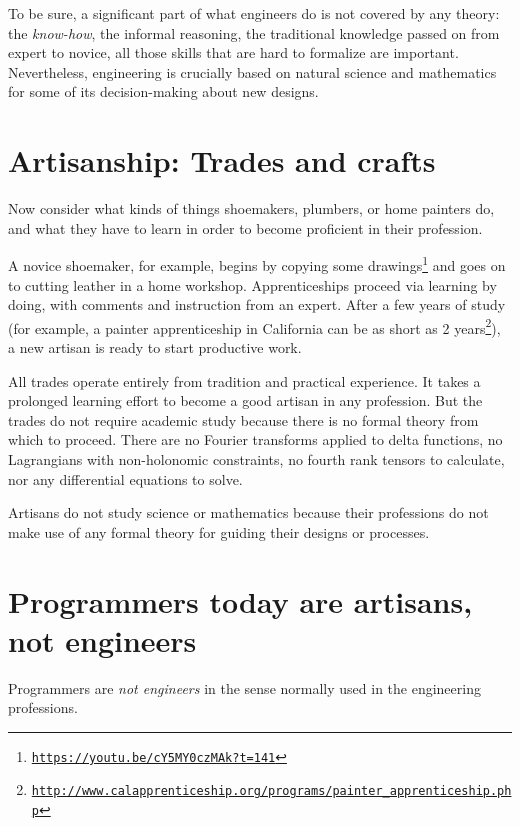 To be sure, a significant part of what engineers do is not covered
by any theory: the \emph{know-how}, the informal reasoning, the traditional
knowledge passed on from expert to novice,  \textemdash{} all those
skills that are hard to formalize are important. Nevertheless, engineering
is crucially based on natural science and mathematics for some of
its decision-making about new designs.

\section{Artisanship: Trades and crafts }

Now consider what kinds of things shoemakers, plumbers, or home painters
do, and what they have to learn in order to become proficient in their
profession.

A novice shoemaker, for example, begins by copying some drawings\footnote{\texttt{\href{https://youtu.be/cY5MY0czMAk?t=141}{https://youtu.be/cY5MY0czMAk?t=141}}}
and goes on to cutting leather in a home workshop. Apprenticeships
proceed via learning by doing, with comments and instruction from
an expert. After a few years of study (for example, a painter apprenticeship
in California can be as short as 2 years\footnote{\texttt{\href{http://www.calapprenticeship.org/programs/painter_apprenticeship.php}{http://www.calapprenticeship.org/programs/painter\_apprenticeship.php}}}),
a new artisan is ready to start productive work. 

All trades operate entirely from tradition and practical experience.
It takes a prolonged learning effort to become a good artisan in any
profession. But the trades do not require academic study because there
is no formal theory from which to proceed. There are no Fourier transforms
applied to delta functions, no Lagrangians with non-holonomic constraints,
no fourth rank tensors to calculate, nor any differential equations
to solve.

Artisans do not study science or mathematics because their professions
do not make use of any formal theory for guiding their designs or
processes.

\section{Programmers today are artisans, not engineers }

Programmers are \emph{not engineers} in the sense normally used in
the engineering professions.

